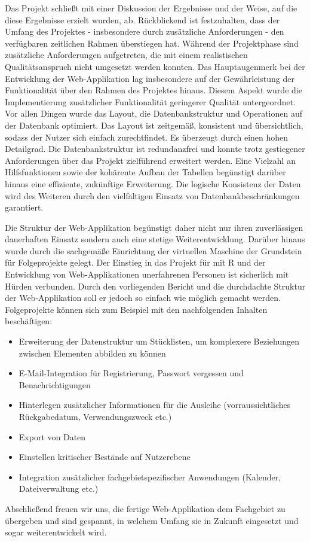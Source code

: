 \documentclass[
]{article}
\providecommand{\tightlist}{%
  \setlength{\itemsep}{0pt}\setlength{\parskip}{0pt}}
\begin{document}
Das Projekt schließt mit einer Diskussion der Ergebnisse und der Weise, auf die diese Ergebnisse erzielt wurden, ab. Rückblickend ist festzuhalten, dass der Umfang des Projektes - insbesondere durch zusätzliche Anforderungen - den verfügbaren zeitlichen Rahmen überstiegen hat. Während der Projektphase sind zusätzliche Anforderungen aufgetreten, die mit einem realistischen Qualitätsanspruch nicht umgesetzt werden konnten. Das Hauptaugenmerk bei der Entwicklung der Web-Applikation lag insbesondere auf der Gewährleistung der Funktionalität über den Rahmen des Projektes hinaus. Diesem Aspekt wurde die Implementierung zusätzlicher Funktionalität geringerer Qualität untergeordnet. Vor allen Dingen wurde das Layout, die Datenbankstruktur und Operationen auf der Datenbank optimiert. Das Layout ist zeitgemäß, konsistent und übersichtlich, sodass der Nutzer sich einfach zurechtfindet. Es überzeugt durch einen hohen Detailgrad. Die Datenbankstruktur ist redundanzfrei und konnte trotz gestiegener Anforderungen über das Projekt zielführend erweitert werden. Eine Vielzahl an Hilfsfunktionen sowie der kohärente Aufbau der Tabellen begünstigt darüber hinaus eine effiziente, zukünftige Erweiterung. Die logische Konsistenz der Daten wird des Weiteren durch den vielfältigen Einsatz von Datenbankbeschränkungen garantiert.

Die Struktur der Web-Applikation begünstigt daher nicht nur ihren zuverlässigen dauerhaften Einsatz sondern auch eine stetige Weiterentwicklung. Darüber hinaus wurde durch die sachgemäße Einrichtung der virtuellen Maschine der Grundstein für Folgeprojekte gelegt. Der Einstieg in das Projekt für mit R und der Entwicklung von Web-Applikationen unerfahrenen Personen ist sicherlich mit Hürden verbunden. Durch den vorliegenden Bericht und die durchdachte Struktur der Web-Applikation soll er jedoch so einfach wie möglich gemacht werden. Folgeprojekte können sich zum Beispiel mit den nachfolgenden Inhalten beschäftigen:

\begin{itemize}
\tightlist
\item
  Erweiterung der Datenstruktur um Stücklisten, um komplexere Beziehungen zwischen Elementen abbilden zu können
\item
  E-Mail-Integration für Registrierung, Passwort vergessen und Benachrichtigungen
\item
  Hinterlegen zusätzlicher Informationen für die Ausleihe (vorraussichtliches Rückgabedatum, Verwendungszweck etc.)
\item
  Export von Daten
\item
  Einstellen kritischer Bestände auf Nutzerebene
\item
  Integration zusätzlicher fachgebietspezifischer Anwendungen (Kalender, Dateiverwaltung etc.)
\end{itemize}

Abschließend freuen wir uns, die fertige Web-Applikation dem Fachgebiet zu übergeben und sind gespannt, in welchem Umfang sie in Zukunft eingesetzt und sogar weiterentwickelt wird.

\clearpage


\null


\printbibliography
\end{document}
